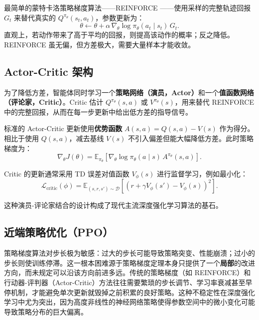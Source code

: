 最简单的蒙特卡洛策略梯度算法——REINFORCE\cite{1992Simple} ——使用采样的完整轨迹回报 $G_t$ 来替代真实的 $Q^{\pi_\theta}(s_t, a_t)$，参数更新为：
\begin{equation}
\theta \leftarrow \theta + \alpha \, \nabla_\theta \log \pi_\theta(a_t \mid s_t) \, G_t.
\end{equation}
直观上，若动作带来了高于平均的回报，则提高该动作的概率；反之降低。REINFORCE 虽无偏，但方差极大，需要大量样本才能收敛。

\subsection{Actor-Critic 架构}

为了降低方差，智能体同时学习一个\textbf{策略网络（演员，Actor）}和一个\textbf{值函数网络（评论家，Critic）}。Critic 估计 $Q^{\pi_\theta}(s,a)$ 或 $V^{\pi_\theta}(s)$，用来替代 REINFORCE 中的完整回报，从而在每一步更新中给出低方差的指导信号。

标准的 Actor-Critic 更新使用\textbf{优势函数} $A(s,a) = Q(s,a) - V(s)$ 作为得分。相比于使用 $Q(s,a)$，减去基线 $V(s)$ 不引入偏差但能大幅降低方差。此时策略梯度为：
\begin{equation}
\nabla_\theta J(\theta) = \mathbb{E}_{\pi_\theta}\left[ \nabla_\theta \log \pi_\theta(a \mid s) \, A^{\pi_\theta}(s, a) \right].
\end{equation}

Critic 的更新通常采用 TD 误差对值函数 $V_\phi(s)$ 进行监督学习，例如最小化：
\begin{equation}
\mathcal{L}_{\text{critic}}(\phi) = \mathbb{E}_{(s, r, s') \sim \mathcal{D}} \left[ \left( r + \gamma V_\phi(s') - V_\phi(s) \right)^2 \right].
\end{equation}

这种演员-评论家结合的设计构成了现代主流深度强化学习算法的基石\cite{2001Actor}。

\subsection{近端策略优化（PPO）}

策略梯度算法对步长极为敏感：过大的步长可能导致策略突变、性能崩溃；过小的步长则使训练停滞。这一根本困难源于策略梯度定理本身只提供了一个\textbf{局部}的改进方向，而未规定可以沿该方向前进多远。传统的策略梯度（如 REINFORCE）和行动器-评判器（Actor-Critic）方法往往需要繁琐的步长调节、学习率衰减甚至早停机制，才能避免单次更新就毁掉之前积累的良好策略。这种不稳定性在深度强化学习中尤为突出，因为高度非线性的神经网络策略使得参数空间中的微小变化可能导致策略分布的巨大偏离。

